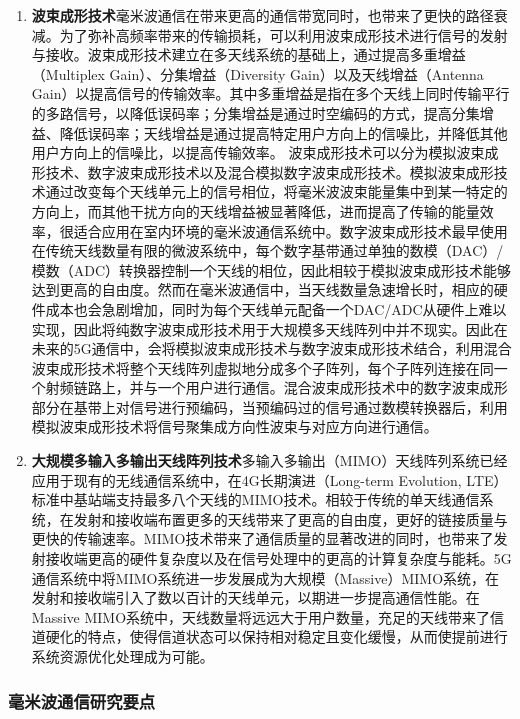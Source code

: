 \begin{enumerate}
\item \textbf{波束成形技术}\quad 毫米波通信在带来更高的通信带宽同时，也带来了更快的路径衰减。为了弥补高频率带来的传输损耗，可以利用波束成形技术进行信号的发射与接收。波束成形技术建立在多天线系统的基础上，通过提高多重增益（Multiplex Gain）、分集增益（Diversity Gain）以及天线增益（Antenna Gain）以提高信号的传输效率。其中多重增益是指在多个天线上同时传输平行的多路信号，以降低误码率；分集增益是通过时空编码的方式，提高分集增益、降低误码率；天线增益是通过提高特定用户方向上的信噪比，并降低其他用户方向上的信噪比，以提高传输效率。
波束成形技术可以分为模拟波束成形技术\cite{venkateswaran2010analog}、数字波束成形技术\cite{spencer2004zero}以及混合模拟数字波束成形技术\cite{han2015large}。模拟波束成形技术通过改变每个天线单元上的信号相位，将毫米波波束能量集中到某一特定的方向上，而其他干扰方向的天线增益被显著降低，进而提高了传输的能量效率，很适合应用在室内环境的毫米波通信系统中。数字波束成形技术最早使用在传统天线数量有限的微波系统中，每个数字基带通过单独的数模（DAC）/模数（ADC）转换器控制一个天线的相位，因此相较于模拟波束成形技术能够达到更高的自由度。然而在毫米波通信中，当天线数量急速增长时，相应的硬件成本也会急剧增加，同时为每个天线单元配备一个DAC/ADC从硬件上难以实现，因此将纯数字波束成形技术用于大规模多天线阵列中并不现实。因此在未来的5G通信中，会将模拟波束成形技术与数字波束成形技术结合，利用混合波束成形技术将整个天线阵列虚拟地分成多个子阵列，每个子阵列连接在同一个射频链路上，并与一个用户进行通信。混合波束成形技术中的数字波束成形部分在基带上对信号进行预编码，当预编码过的信号通过数模转换器后，利用模拟波束成形技术将信号聚集成方向性波束与对应方向进行通信。

\item \textbf{大规模多输入多输出天线阵列技术}\quad 多输入多输出（MIMO）天线阵列系统\cite{rusek2013scaling}已经应用于现有的无线通信系统中，在4G长期演进（Long-term Evolution, LTE）标准中基站端支持最多八个天线的MIMO技术。相较于传统的单天线通信系统，在发射和接收端布置更多的天线带来了更高的自由度，更好的链接质量与更快的传输速率。MIMO技术带来了通信质量的显著改进的同时，也带来了发射接收端更高的硬件复杂度以及在信号处理中的更高的计算复杂度与能耗。5G通信系统中将MIMO系统进一步发展成为大规模（Massive）MIMO系统，在发射和接收端引入了数以百计的天线单元，以期进一步提高通信性能。在Massive MIMO系统中，天线数量将远远大于用户数量，充足的天线带来了信道硬化的特点，使得信道状态可以保持相对稳定且变化缓慢，从而使提前进行系统资源优化处理成为可能。
\end{enumerate}

\subsubsection{毫米波通信研究要点}

